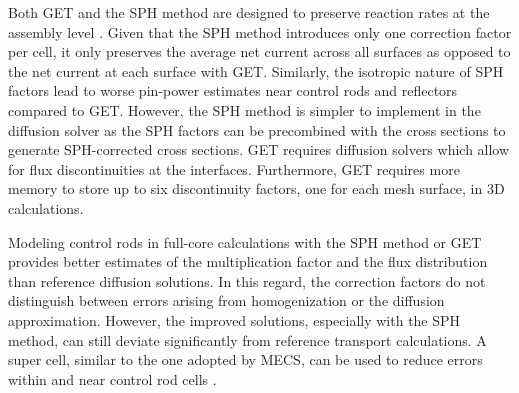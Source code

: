 Both \gls{GET} and the \gls{SPH} method are designed to preserve reaction rates at the assembly
level \cite{yamamoto_cell_2004}. Given that the \gls{SPH} method introduces only one correction
factor per cell, it only preserves the average net current across all surfaces as opposed
to the net current at each surface with \gls{GET}. Similarly, the isotropic nature of \gls{SPH}
factors lead to worse pin-power estimates near control rods and reflectors compared to \gls{GET}.
However, the \gls{SPH} method is simpler to implement in the diffusion solver as the \gls{SPH}
factors can be precombined with the cross sections to generate \gls{SPH}-corrected cross sections.
\gls{GET} requires diffusion solvers which allow for flux discontinuities at the interfaces.
Furthermore, \gls{GET} requires more memory to store up to six discontinuity factors, one for each
mesh surface, in 3D calculations.

Modeling control rods in full-core calculations with the \gls{SPH} method or \gls{GET} provides
better estimates of the multiplication factor and the flux distribution than reference diffusion
solutions. In this regard, the correction factors do not distinguish between errors arising from
homogenization or the diffusion approximation. However, the improved solutions, especially with the
\gls{SPH} method, can still deviate significantly from reference transport calculations. A super
cell, similar to the one adopted by \gls{MECS}, can be used to reduce errors within and near
control rod cells \cite{ortensi_newton_2018}.
